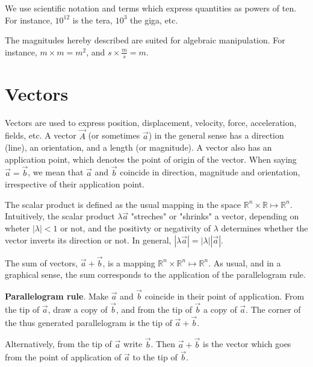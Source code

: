 \documentclass[12pt]{article}
\theoremstyle{definition}
\begin{document}
We use scientific notation and terms which express quantities as powers of ten.
For instance, $10^{12}$ is the tera, $10^{3}$ the giga, etc.

The magnitudes hereby described are suited for algebraic manipulation. For
instance, $m \times m = m^2$, and $s \times \frac{m}{s} = m$.

\section{Vectors}

Vectors are used to express position, displacement, velocity, force,
acceleration, fields, etc. A vector $\overrightarrow{A}$ (or sometimes
$\overrightarrow{a}$) in the general sense has a direction (line), an
orientation, and a length (or magnitude). A vector also has an application
point, which denotes the point of origin of the vector. When saying $\overrightarrow{a}
= \overrightarrow{b}$, we mean that $\overrightarrow{a}$ and
$\overrightarrow{b}$ coincide in direction, magnitude and orientation,
irrespective of their application point. 

The scalar product is defined as the usual mapping in the space $\mathbb{R}^n
\times \mathbb{R} \mapsto \mathbb{R}^n$. Intuitively, the scalar product $\lambda
\overrightarrow{a}$
"streches" or "shrinks" a vector, depending on wheter $|\lambda| < 1$ or not,
and the positivty or negativity of $\lambda$ determines whether the vector
inverts its direction or not. In general, $\left| \lambda \overrightarrow{a}
\right| = \left| \lambda \right| \left| \overrightarrow{a} \right| $.

The sum of vectors, $\overrightarrow{a} + \overrightarrow{b}$, is a mapping
$\mathbb{R}^n \times \mathbb{R}^n \mapsto \mathbb{R}^n$. As usual, and in a
graphical sense, the sum corresponds to the application of the parallelogram
rule. 

\begin{shaded}
    \textbf{Parallelogram rule}. Make $\overrightarrow{a}$ and
    $\overrightarrow{b}$ coincide in their point of application. From the tip of 
    $\overrightarrow{a}$, draw a copy of $\overrightarrow{b}$, and from the tip
    of $\overrightarrow{b}$ a copy of $\overrightarrow{a}$. The corner of the
    thus generated parallelogram is the tip of $\overrightarrow{a} +
    \overrightarrow{b}$.

    Alternatively, from the tip of $\overrightarrow{a}$ write
    $\overrightarrow{b}$. Then $\overrightarrow{a} + \overrightarrow{b}$ is the
    vector which goes from the point of application of $\overrightarrow{a}$ to
    the tip of $\overrightarrow{b}$.
\end{shaded}
\end{document}
